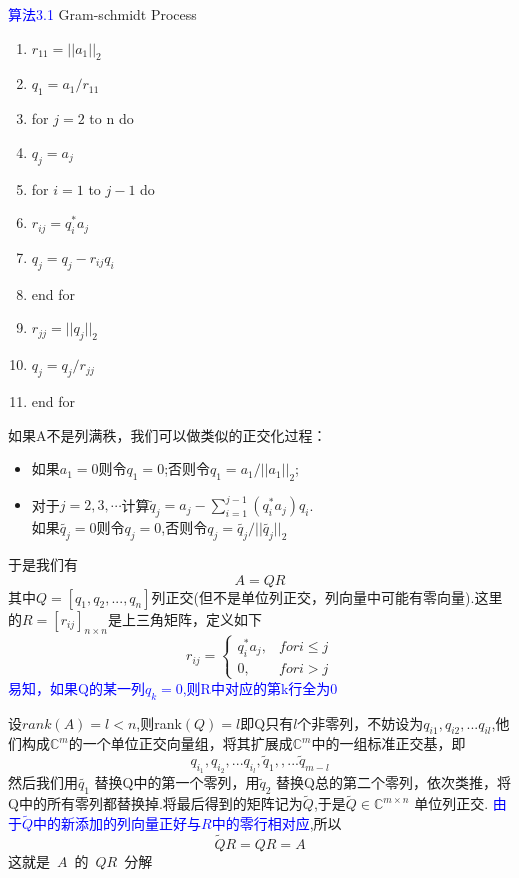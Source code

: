 \documentclass[notheorems,serif]{beamer}
\begin{document}
\begin{frame}
\textcolor{blue}{算法3.1} Gram-schmidt Process\\
\begin{enumerate}[1:]
	\item $r_{11}=||a_{1}||_{2}$
	\item $q_{1}=a_{1}/r_{11}$
	\item  for $j = 2$ to n do
	\item  \qquad $q_{j}=a_{j}$
	\item  \qquad for $i=1$ to $j-1$ do
	\item  \qquad \qquad $r_{ij}=q_{i}^{*}a_{j}$
	\item  \qquad \qquad $q_{j}=q_{j}-r_{ij}q_{i}$
	\item \qquad end for
	\item \qquad $r_{jj}=||q_{j}||_{2}$
	\item \qquad $q_{j}=q_{j}/r_{jj}$
	\item end for
\end{enumerate}
\end{frame} 

\begin{frame}
如果A不是列满秩，我们可以做类似的正交化过程：
\begin{itemize}
	\item 如果$a_1=0$则令$q_1=0$;否则令$q_1=a_1/||a_1||_2$;
	\item 对于$j=2,3,\cdots$计算$\tilde{q}_{j}=a_j-\sum_{i=1}^{j-1}(q_i^*a_j)q_i$.\\
	如果$\tilde{q_j}=0$则令$q_j=0$,否则令$q_j=\tilde{q_j}/||\tilde{q_j}||_2$\\
\end{itemize}
于是我们有
\[
A=QR
\]
其中$Q=[q_1,q_2,...,q_n]$列正交(但不是单位列正交，列向量中可能有零向量).这里的$R=[r_{ij}]_{n\times n}$是上三角矩阵，定义如下
\[
r_{ij}=
\begin{cases}
q_{i}^{*} a_{j},&for i\leq j\\
0,&for i>j
\end{cases}
\]
\textcolor{blue}{易知，如果Q的某一列$q_k=0$,则R中对应的第k行全为0}
\end{frame}

\begin{frame}
设$rank(A)=l<n$,则rank$(Q)=l$即Q只有$l$个非零列，不妨设为$ q_{i1},q_{i2},...q_{il} $,他们构成$ \mathbb{C}^m $的一个单位正交向量组，将其扩展成$ \mathbb{C}^m $中的一组标准正交基，即
\[
q_{i_1},q_{i_2},...q_{i_l},\tilde{q}_1,,...\tilde{q}_{m-l}
\]
然后我们用$ \tilde{q_1} $ 替换Q中的第一个零列，用$ \tilde{q}_2 $	替换Q总的第二个零列，依次类推，将Q中的所有零列都替换掉.将最后得到的矩阵记为$\tilde{Q}$,于是$\tilde{Q}\in\mathbb{C}^{m\times n}$ 单位列正交. \textcolor{blue}{由于$\tilde{Q}$中的新添加的列向量正好与$R$中的零行相对应},所以
\[
\tilde{Q}R=QR=A
\]
这就是~$A$~的~$QR$~分解
\end{frame}
\end{document}
